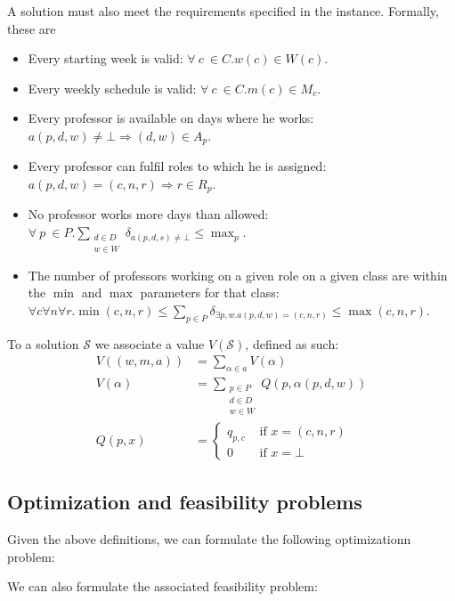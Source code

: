 A solution must also meet the requirements specified in the instance. Formally, these are

\begin{itemize}
\item Every starting week is valid: $\forall\ c\ \in C. w(c) \in W(c)$.
\item Every weekly schedule is valid: $\forall\ c\ \in C. m(c) \in M_c$.
\item Every professor is available on days where he works: $a(p, d, w) \ne \bot \Rightarrow (d, w) \in A_p$.
\item Every professor can fulfil roles to which he is assigned: $a(p, d, w) = (c, n, r) \Rightarrow r \in R_p$.
\item No professor works more days than allowed: $\forall\ p\ \in P. \sum_{\substack{d \in D\\w \in W}} \delta_{a(p, d, s) \ne \bot} \le \max_p$.
\item The number of professors working on a given role on a given class are within the $\min$ and $\max$ parameters for that class: $\forall c \forall n \forall r. \min(c, n, r) \le \sum_{p \in P} \delta_{\exists p, w. a(p, d, w) = (c, n, r)} \le \max(c, n, r)$.
\end{itemize}

To a solution $\mathcal{S}$ we associate a value $V(\mathcal{S})$, defined as such:
\begin{align*}
V((w, m, a)) &= \sum_{\alpha \in a} V(\alpha)\\
V(\alpha) &= \sum_{\substack{p \in P \\d \in D \\ w \in W}} Q(p, \alpha(p, d, w))\\
Q(p, x) &= \begin{cases}
q_{p, c} & \text{ if } x = (c, n, r)\\
0 &\text{ if } x = \bot
\end{cases}
\end{align*}

\newpage
\subsection{Optimization and feasibility problems}

Given the above definitions, we can formulate the following optimizationn problem:

We can also formulate the associated feasibility problem:
